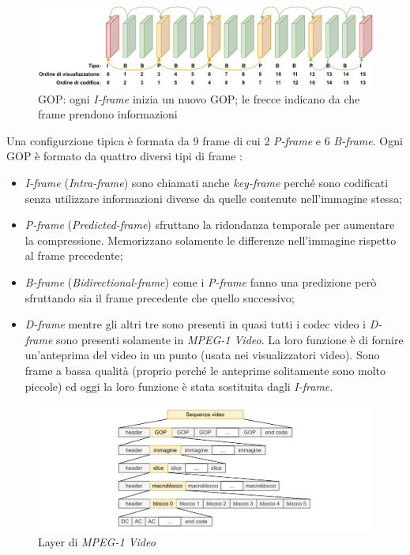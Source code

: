 \begin{figure}[H]
	\includegraphics[width=\linewidth]{immagini/gop}
	\caption{GOP: ogni \textit{I-frame} inizia un nuovo GOP; le frecce indicano da che frame prendono informazioni}
	\label{fig:gop}
\end{figure}

Una configurzione tipica è formata da 9 frame di cui 2 \textit{P-frame} e 6 \textit{B-frame}. Ogni GOP è formato da quattro diversi tipi di frame \parencite{VideoAndMultimediaTransmissionsOverCellularNetworks}:

\begin{itemize}
	\item \textit{I-frame} (\textit{Intra-frame}) sono chiamati anche \textit{key-frame} perché sono codificati senza utilizzare informazioni diverse da quelle contenute nell'immagine stessa;
	\item \textit{P-frame} (\textit{Predicted-frame}) sfruttano la ridondanza temporale per aumentare la compressione. Memorizzano solamente le differenze nell'immagine rispetto al frame precedente;
	\item \textit{B-frame} (\textit{Bidirectional-frame}) come i \textit{P-frame} fanno una predizione però sfruttando sia il frame precedente che quello successivo;
	\item \textit{D-frame} mentre gli altri tre sono presenti in quasi tutti i codec video i \textit{D-frame} sono presenti solamente in \textit{MPEG-1 Video}. La loro funzione è di fornire un'anteprima del video in un punto (usata nei visualizzatori video). Sono frame a bassa qualità (proprio perché le anteprime solitamente sono molto piccole) ed oggi la loro funzione è stata sostituita dagli \textit{I-frame}.
\end{itemize}

\begin{figure}[H]
	\includegraphics[width=\linewidth]{immagini/MPEG_layers}
	\caption{Layer di \textit{MPEG-1 Video}}
	\label{fig:MPEG_layers}
\end{figure}

